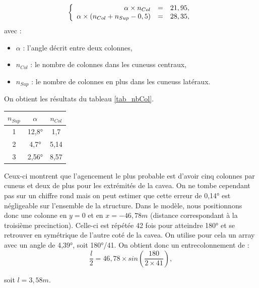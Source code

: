 \begin{equation}
  \left \{
   \begin{array}{r c l}
      \alpha \times n_{Col}  & = & 21,95, \\
      \alpha \times (n_{Col} + n_{Sup} - 0,5)   & = &  28,35,
   \end{array}
   \right .
\end{equation}
avec :
\begin{itemize}
\item $\alpha$ : l'angle décrit entre deux colonnes,
\item $n_{Col}$ : le nombre de colonnes dans les \glspl{cuneus} centraux,
\item $n_{Sup}$ : le nombre de colonnes en plus dans les \glspl{cuneus} latéraux.
\end{itemize}
On obtient les résultats du tableau \ref{tab_nbCol}.
%
\begin{tableth} 
	\begin{tabular}{| c | c | c |}
		\hline
		$n_{Sup}$ & $\alpha$ &  $n_{Col}$\\
		  \hline
		  \hline
		   1 & 12,8° & 1,7 \\
		   \hline
		2 & 4,7° & 5,14 \\
		   \hline
		3 & 2,56° & 8,57 \\
		   \hline
	 \end{tabular}
	\caption{Angle entre deux colonne et nombre de colonnes par \gls{cuneus} en fonction du nombre de colonnes supplémentaires dans les \glspl{cuneus} latéraux.}
	\label{tab_nbCol}
\end{tableth}
%
Ceux-ci montrent que l'agencement le plus probable est d'avoir cinq colonnes par \gls{cuneus} et deux de plus pour les extrémités de la \gls{cavea}. On ne tombe cependant pas sur un chiffre rond mais on peut estimer que cette erreur de 0,14° est négligeable sur l'ensemble de la structure. Dans le modèle, nous positionnons donc une colonne en $y=0$ et en $x=-46,78m$ (distance correspondant à la troisième \gls{precinction}). Celle-ci est répétée 42 fois pour atteindre 180° et se retrouver en symétrique de l'autre coté de la \gls{cavea}. On utilise pour cela un \gls{array} avec un angle de 4,39°, soit 180°/41. On obtient donc un entrecolonnement de :
\begin{equation}
	\frac{l}{2} =  46,78 \times  sin(\frac{180}{2 \times 41}), 
\end{equation}
\begin{center}
	soit $l = 3,58m$.
\end{center}	

